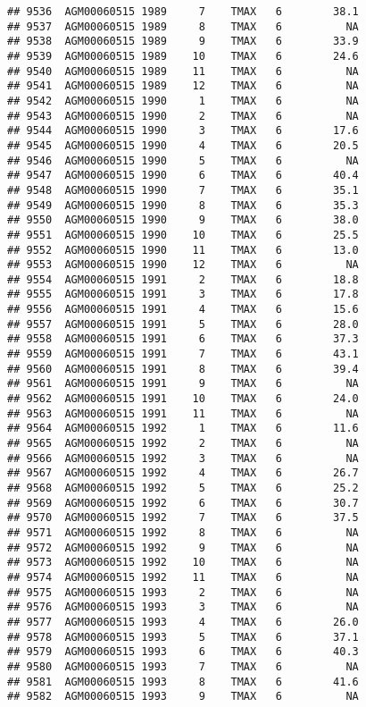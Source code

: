 \documentclass{article}\usepackage[]{graphicx}\usepackage[]{color}
\makeatletter
\newenvironment{kframe}{%
 \def\at@end@of@kframe{}%
 \ifinner\ifhmode%
  \def\at@end@of@kframe{\end{minipage}}%
  \begin{minipage}{\columnwidth}%
 \fi\fi%
 \def\FrameCommand##1{\hskip\@totalleftmargin \hskip-\fboxsep
 \colorbox{shadecolor}{##1}\hskip-\fboxsep
     \hskip-\linewidth \hskip-\@totalleftmargin \hskip\columnwidth}%
 \MakeFramed {\advance\hsize-\width
   \@totalleftmargin\z@ \linewidth\hsize
   \@setminipage}}%
 {\par\unskip\endMakeFramed%
 \at@end@of@kframe}
\newenvironment{knitrout}{}{} %
\makeatother
\begin{document}
\begin{knitrout}
\begin{kframe}
\begin{verbatim}
## 9536  AGM00060515 1989     7    TMAX   6        38.1
## 9537  AGM00060515 1989     8    TMAX   6          NA
## 9538  AGM00060515 1989     9    TMAX   6        33.9
## 9539  AGM00060515 1989    10    TMAX   6        24.6
## 9540  AGM00060515 1989    11    TMAX   6          NA
## 9541  AGM00060515 1989    12    TMAX   6          NA
## 9542  AGM00060515 1990     1    TMAX   6          NA
## 9543  AGM00060515 1990     2    TMAX   6          NA
## 9544  AGM00060515 1990     3    TMAX   6        17.6
## 9545  AGM00060515 1990     4    TMAX   6        20.5
## 9546  AGM00060515 1990     5    TMAX   6          NA
## 9547  AGM00060515 1990     6    TMAX   6        40.4
## 9548  AGM00060515 1990     7    TMAX   6        35.1
## 9549  AGM00060515 1990     8    TMAX   6        35.3
## 9550  AGM00060515 1990     9    TMAX   6        38.0
## 9551  AGM00060515 1990    10    TMAX   6        25.5
## 9552  AGM00060515 1990    11    TMAX   6        13.0
## 9553  AGM00060515 1990    12    TMAX   6          NA
## 9554  AGM00060515 1991     2    TMAX   6        18.8
## 9555  AGM00060515 1991     3    TMAX   6        17.8
## 9556  AGM00060515 1991     4    TMAX   6        15.6
## 9557  AGM00060515 1991     5    TMAX   6        28.0
## 9558  AGM00060515 1991     6    TMAX   6        37.3
## 9559  AGM00060515 1991     7    TMAX   6        43.1
## 9560  AGM00060515 1991     8    TMAX   6        39.4
## 9561  AGM00060515 1991     9    TMAX   6          NA
## 9562  AGM00060515 1991    10    TMAX   6        24.0
## 9563  AGM00060515 1991    11    TMAX   6          NA
## 9564  AGM00060515 1992     1    TMAX   6        11.6
## 9565  AGM00060515 1992     2    TMAX   6          NA
## 9566  AGM00060515 1992     3    TMAX   6          NA
## 9567  AGM00060515 1992     4    TMAX   6        26.7
## 9568  AGM00060515 1992     5    TMAX   6        25.2
## 9569  AGM00060515 1992     6    TMAX   6        30.7
## 9570  AGM00060515 1992     7    TMAX   6        37.5
## 9571  AGM00060515 1992     8    TMAX   6          NA
## 9572  AGM00060515 1992     9    TMAX   6          NA
## 9573  AGM00060515 1992    10    TMAX   6          NA
## 9574  AGM00060515 1992    11    TMAX   6          NA
## 9575  AGM00060515 1993     2    TMAX   6          NA
## 9576  AGM00060515 1993     3    TMAX   6          NA
## 9577  AGM00060515 1993     4    TMAX   6        26.0
## 9578  AGM00060515 1993     5    TMAX   6        37.1
## 9579  AGM00060515 1993     6    TMAX   6        40.3
## 9580  AGM00060515 1993     7    TMAX   6          NA
## 9581  AGM00060515 1993     8    TMAX   6        41.6
## 9582  AGM00060515 1993     9    TMAX   6          NA

\end{verbatim}
\end{kframe}
\end{knitrout}
\end{document}
